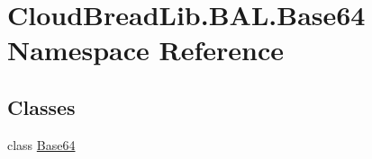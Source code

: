 \hypertarget{a00426}{}\section{Cloud\+Bread\+Lib.\+B\+A\+L.\+Base64 Namespace Reference}
\label{a00426}
\subsection*{Classes}
\begin{DoxyCompactItemize}
\item 
class \hyperlink{a00020}{Base64}
\end{DoxyCompactItemize}

